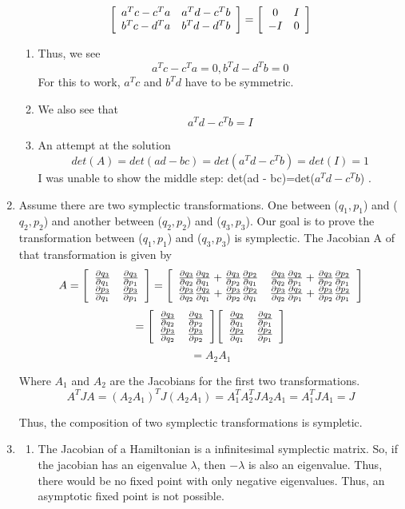 \documentclass[a4paper,11pt]{article}
\newenvironment{mat}{\left[ \begin{array}{ccccccccccccc}}{\end{array}\right]}
\newcommand\bcm{\begin{mat}}
\newcommand\ecm{\end{mat}}
\begin{document}
\begin{enumerate}
	\[ \bcm a^Tc-c^Ta & a^Td-c^T b \\ b^Tc-d^Ta &b^Td-d^Tb \ecm = \bcm 0& I \\ -I &0 \ecm\]
	\begin{enumerate}
		\item
	Thus, we see 
	\[a^Tc-c^Ta =0, b^Td-d^Tb=0 \] 
	For this to work, $a^Tc$ and $b^Td$ have to be symmetric.
	\item
	We also see that 
	\[a^Td-c^T b =I\]
	\item
	 An attempt at the solution
	\[det(A)= det(ad - bc)=det(a^Td-c^Tb) = det(I)=1\]
	I was unable to show the middle step: det(ad - bc)=det($a^Td-c^Tb$) .
\end{enumerate}
	
	
	
	\item
	Assume there are two symplectic transformations. One between ($q_1,p_1$) and ($q_2,p_2$) and another between ($q_2,p_2$) and ($q_3,p_3$). Our goal is to prove the transformation between ($q_1,p_1$) and ($q_3,p_3$) is symplectic.
	The Jacobian A of that transformation is given by 
	\[A = \bcm \frac{\partial q_3}{\partial q_1} & \frac{\partial q_3}{\partial p_1} \\ \frac{\partial p_3}{\partial q_1} & \frac{\partial p_3}{\partial p_1}\ecm= \bcm \frac{\partial q_3}{\partial q_2}\frac{\partial q_2}{\partial q_1} + \frac{\partial q_3}{\partial p_2}\frac{\partial p_2}{\partial q_1} & \frac{\partial q_3}{\partial q_2}\frac{\partial q_2}{\partial p_1} + \frac{\partial q_3}{\partial p_2}\frac{\partial p_2}{\partial p_1} \\ \frac{\partial p_3}{\partial q_2}\frac{\partial q_2}{\partial q_1} + \frac{\partial p_3}{\partial p_2}\frac{\partial p_2}{\partial q_1} & \frac{\partial p_3}{\partial q_2}\frac{\partial q_2}{\partial p_1} + \frac{\partial p_3}{\partial p_2}\frac{\partial p_2}{\partial p_1}\ecm\]
	\[=\bcm \frac{\partial q_3}{\partial q_2} & \frac{\partial q_3}{\partial p_2} \\ \frac{\partial p_3}{\partial q_2} & \frac{\partial p_3}{\partial p_2}\ecm \bcm \frac{\partial q_2}{\partial q_1} & \frac{\partial q_2}{\partial p_1} \\ \frac{\partial p_2}{\partial q_1} & \frac{\partial p_2}{\partial p_1}\ecm \]
	\[= A_2 A_1\]
	
	Where $A_1$ and $A_2$ are the Jacobians for the first two transformations.
	\[A^TJA=(A_2 A_1)^TJ(A_2 A_1)= A_1^T A_2^T J A_2 A_1 =A_1^T J A_1 = J  \]
	
	Thus, the composition of two symplectic transformations is sympletic.
	\item 
	\begin{enumerate}
		\item
		The Jacobian of a Hamiltonian is a infinitesimal symplectic matrix. So, if the jacobian has an eigenvalue $\lambda$, then $-\lambda$ is also an eigenvalue. Thus, there would be no fixed point with only negative eigenvalues. Thus, an asymptotic fixed point is not possible.


\end{enumerate}
\end{enumerate}
\end{document}
